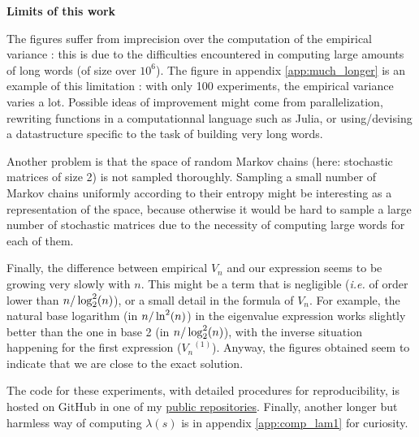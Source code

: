 \begin{remarque}
\noindent \textbf{Limits of this work}


The figures suffer from imprecision over the computation of the empirical 
variance : this is due to the difficulties encountered in computing large amounts
of long words (of size over $10^6$). The figure in appendix \ref{app:much_longer} is 
an example of this limitation : with only 100 experiments, the empirical variance 
varies a lot. Possible ideas of improvement might come from parallelization,
rewriting functions in a computationnal language such as Julia, or using/devising a datastructure
specific to the task of building very long words.

Another problem is that the space of random Markov chains (here: stochastic matrices
of size 2) is not sampled thoroughly. Sampling a small number of Markov chains uniformly
according to their entropy might be interesting as a representation of the space,
 because otherwise it would be hard to sample a large number of stochastic matrices
due to the necessity of computing large words for each of them.

Finally, the difference between empirical $V_n$ and our expression seems to be growing
very slowly with $n$. This might be a term that is negligible (\textit{i.e.} of 
order lower than $n/\log_2^2(n)$), or a small detail in the formula of $V_n$. 
For example, the natural base logarithm (in $n/\ln^2(n)$) in the eigenvalue expression works slightly
better than the one in base 2 (in $n/\log_2^2(n)$), with the inverse situation happening for the first 
expression (${V_n}^{(1)}$). Anyway, the figures obtained seem to 
indicate that we are close to the exact solution.

\end{remarque}


The code for these experiments, with detailed procedures for reproducibility,
is hosted on GitHub in one of my \href{github.com/gliboc/lz-compression}{public repositories}.
Finally, another longer but harmless way of computing $\lambda(s)$ is in appendix \ref{app:comp_lam1}
for curiosity.



 


